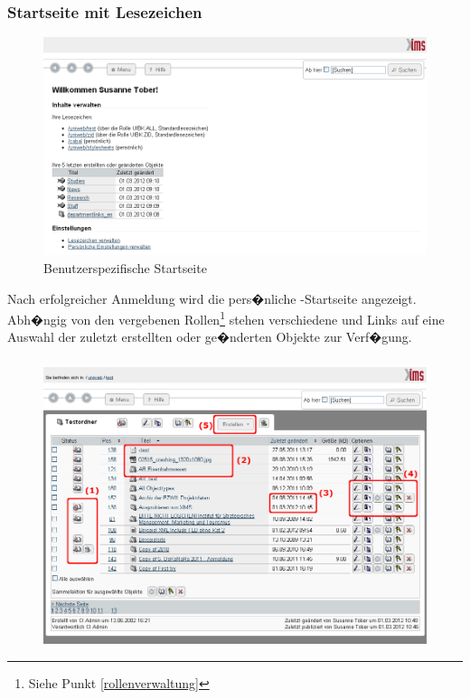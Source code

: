 \subsubsection{Startseite mit Lesezeichen}
\label{quick-startseite}

\begin{figure}[H]
  \centering
  \includegraphics[width=1.00\textwidth]{./images/ximsstartseite.png}
  \caption{Benutzerspezifische  Startseite}
  \label{fig:ximsstartseite}
\end{figure}

Nach erfolgreicher Anmeldung wird die pers�nliche
-Startseite angezeigt. Abh�ngig von den vergebenen
Rollen\footnote{Siehe Punkt \ref{rollenverwaltung}} stehen
verschiedene  und Links auf eine Auswahl der
zuletzt erstellten oder ge�nderten Objekte zur Verf�gung.

\subsubsection{}
\label{quick-containeransicht}

\begin{figure}[H]
  \centering
  \includegraphics[width=1.00\textwidth]{./images/containeransicht1.png}
  \caption{}
  \label{fig:containeransicht}
\end{figure}

